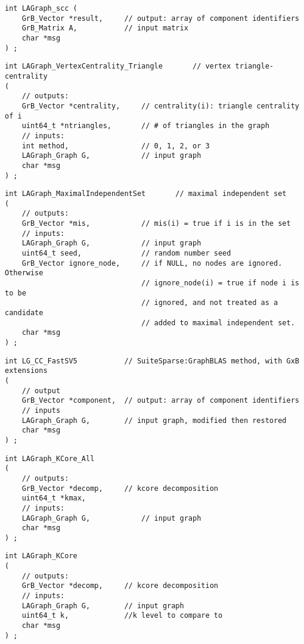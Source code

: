 \begin{verbatim}
int LAGraph_scc (
    GrB_Vector *result,     // output: array of component identifiers
    GrB_Matrix A,           // input matrix
    char *msg
) ;
\end{verbatim}




\begin{verbatim}
int LAGraph_VertexCentrality_Triangle       // vertex triangle-centrality
(
    // outputs:
    GrB_Vector *centrality,     // centrality(i): triangle centrality of i
    uint64_t *ntriangles,       // # of triangles in the graph
    // inputs:
    int method,                 // 0, 1, 2, or 3
    LAGraph_Graph G,            // input graph
    char *msg
) ;
\end{verbatim}




\begin{verbatim}
int LAGraph_MaximalIndependentSet       // maximal independent set
(
    // outputs:
    GrB_Vector *mis,            // mis(i) = true if i is in the set
    // inputs:
    LAGraph_Graph G,            // input graph
    uint64_t seed,              // random number seed
    GrB_Vector ignore_node,     // if NULL, no nodes are ignored.  Otherwise
                                // ignore_node(i) = true if node i is to be
                                // ignored, and not treated as a candidate
                                // added to maximal independent set.
    char *msg
) ;
\end{verbatim}




\begin{verbatim}
int LG_CC_FastSV5           // SuiteSparse:GraphBLAS method, with GxB extensions
(
    // output
    GrB_Vector *component,  // output: array of component identifiers
    // inputs
    LAGraph_Graph G,        // input graph, modified then restored
    char *msg
) ;
\end{verbatim}




\begin{verbatim}
int LAGraph_KCore_All
(
    // outputs:
    GrB_Vector *decomp,     // kcore decomposition
    uint64_t *kmax,
    // inputs:
    LAGraph_Graph G,            // input graph
    char *msg
) ;
\end{verbatim}




\begin{verbatim}
int LAGraph_KCore
(
    // outputs:
    GrB_Vector *decomp,     // kcore decomposition
    // inputs:
    LAGraph_Graph G,        // input graph
    uint64_t k,             //k level to compare to
    char *msg
) ;
\end{verbatim}




